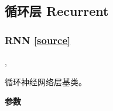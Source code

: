 \subsection{循环层 Recurrent}\label{recurrent}


\subsubsection{RNN {\href{https://github.com/keras-team/keras/blob/master/keras/layers/recurrent.py\#L201}{{[}source{]}}}}

\begin{Shaded}
\begin{Highlighting}[]
\OperatorTok{=}\OperatorTok{=}, \\
\hspace{3cm}\OperatorTok{=}\OperatorTok{=}\OperatorTok{=}\NormalTok{)}
\end{Highlighting}
\end{Shaded}

循环神经网络层基类。

\textbf{参数}

